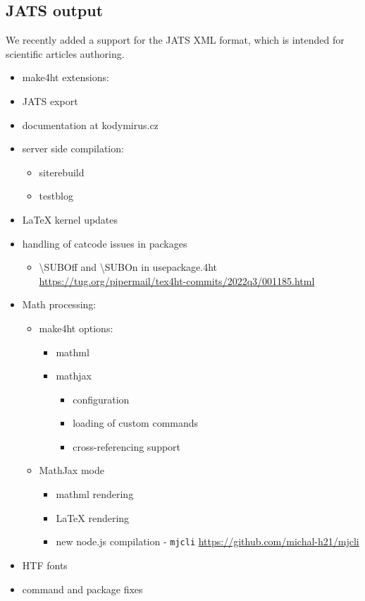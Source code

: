\documentclass{ltugboat}
\begin{document}



\subsection{JATS output}

We recently added a support for the JATS XML format, which is intended for 
scientific articles authoring. 



\begin{itemize}

\item make4ht extensions:
  
\item JATS export
\item documentation at kodymirus.cz
\item server side compilation:
  \begin{itemize}
  \item siterebuild
  \item testblog
  \end{itemize}

\item LaTeX kernel updates
\item handling of catcode issues in packages
  \begin{itemize}
  \item \textbackslash SUBOff and \textbackslash SUBOn in usepackage.4ht
    \url{https://tug.org/pipermail/tex4ht-commits/2022q3/001185.html}
  \end{itemize}
\item Math processing:
  \begin{itemize}
  \item make4ht options:
    \begin{itemize}
    \item mathml
    \item mathjax
      \begin{itemize}
      \item configuration
      \item loading of custom commands
      \item cross-referencing support
      \end{itemize}
    \end{itemize}
  \item MathJax mode
    \begin{itemize}
    \item mathml rendering
    \item LaTeX rendering
    \item
      new node.js compilation - \texttt{mjcli}
      \url{https://github.com/michal-h21/mjcli}
    \end{itemize}
  \end{itemize}
\item HTF fonts
\item command and package fixes


\end{itemize}
\end{document}
